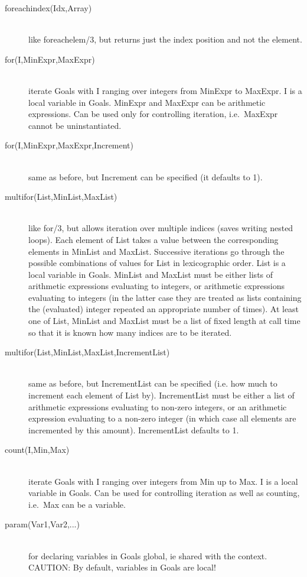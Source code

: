 \begin{description}
\item[foreachindex(Idx,Array)]\ \\
%
    like foreachelem/3, but returns just the index position and not the
    element.

\item[for(I,MinExpr,MaxExpr)]\ \\
%
    iterate Goals with I ranging over integers from MinExpr to MaxExpr.
    I is a local variable in Goals.
    MinExpr and MaxExpr can be arithmetic expressions.
    Can be used only for controlling iteration, i.e.\ MaxExpr cannot
    be uninstantiated.

\item[for(I,MinExpr,MaxExpr,Increment)]\ \\
    same as before, but Increment can be specified (it defaults to 1).

\item[multifor(List,MinList,MaxList)]\ \\
%
    like for/3, but allows iteration over multiple indices (saves
    writing nested loops).  Each element of List takes a value
    between the corresponding elements in MinList and MaxList.
    Successive iterations go through the possible combinations of
    values for List in lexicographic order.  List is a local
    variable in Goals.  MinList and MaxList must be either lists of
    arithmetic expressions evaluating to integers, or arithmetic
    expressions evaluating to integers (in the latter case they are
    treated as lists containing the (evaluated) integer repeated an
    appropriate number of times).  At least one of List, MinList and
    MaxList must be a list of fixed length at call time so that it is
    known how many indices are to be iterated.

\item[multifor(List,MinList,MaxList,IncrementList)]\ \\
    same as before, but IncrementList can be specified (i.e. how
    much to increment each element of List by).  IncrementList must be
    either a list of arithmetic expressions evaluating to non-zero
    integers, or an arithmetic expression evaluating to a non-zero
    integer (in which case all elements are incremented by this
    amount).  IncrementList defaults to 1.

\item[count(I,Min,Max)]\ \\
%
    iterate Goals with I ranging over integers from Min up to Max.
    I is a local variable in Goals.
    Can be used for controlling iteration as well as counting,
    i.e.\ Max can be a variable.

\item[param(Var1,Var2,...)]\ \\
%
    for declaring variables in Goals global, ie shared with the context.
    CAUTION: By default, variables in Goals are local!
\end{description}

